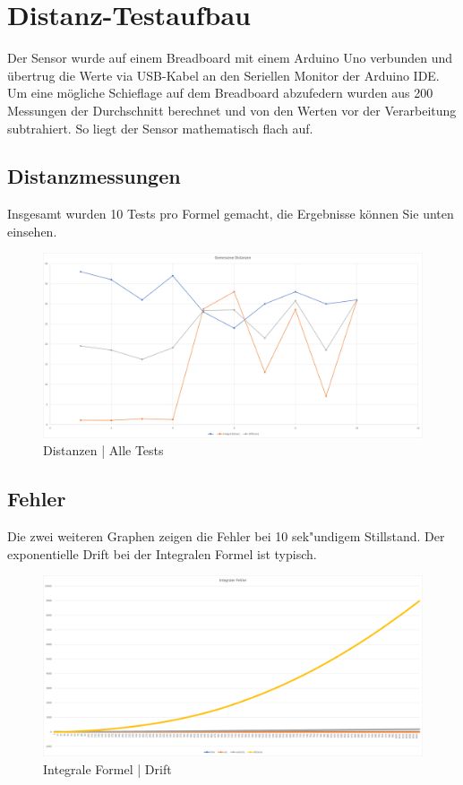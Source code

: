 \section{Distanz-Testaufbau}
Der Sensor wurde auf einem Breadboard mit einem Arduino Uno verbunden und übertrug die Werte
via USB-Kabel an den Seriellen Monitor der Arduino IDE. Um eine mögliche Schieflage auf dem
Breadboard abzufedern wurden aus 200 Messungen der Durchschnitt berechnet und von den Werten vor
der Verarbeitung subtrahiert. So liegt der Sensor mathematisch flach auf. \\

\subsection{Distanzmessungen}
Insgesamt wurden 10 Tests pro Formel gemacht, die Ergebnisse können Sie unten einsehen.\\

\begin{figure} [h]
    \centering
    \includegraphics[width = 15cm]{Bilder/_DistanzVergleich}
    \caption{Distanzen | Alle Tests}
    \end{figure}

\subsection{Fehler}
Die zwei weiteren Graphen zeigen die Fehler bei 10 sek"undigem Stillstand. Der exponentielle Drift 
bei der Integralen Formel ist typisch. 

\begin{figure} [h]
    \centering
    \includegraphics[width = 15cm]{Bilder/_integralDistance001}
    \caption{Integrale Formel | Drift}
    \end{figure}

